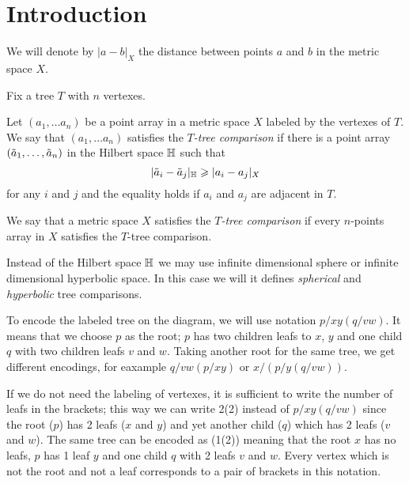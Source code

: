 \section{Introduction}\label{sec:intro}

We will denote by $|a-b|_X$ the distance between points $a$ and $b$ in the metric space $X$.

Fix a tree $T$ with $n$ vertexes.

Let $(a_1,\dots a_n)$ be a point array in a metric space $X$ labeled by the vertexes of $T$.
We say that $(a_1,\dots a_n)$  satisfies the \emph{$T$-tree comparison} if there is a point array $(\~a_1,\dots, \~a_n)$ in the Hilbert space $\HH$ such that 
\[|\~a_i-\~a_j|_\HH\ge|a_i-a_j|_X\]
for any $i$ and $j$ and the equality holds if $a_i$ and $a_j$ are adjacent in $T$.

We say that a metric space $X$ satisfies the \emph{$T$-tree comparison} if 
every $n$-points array in $X$ satisfies the $T$-tree comparison.

Instead of the Hilbert space $\HH$ we may use infinite dimensional sphere or infinite dimensional hyperbolic space.
In this case we will it defines \emph{spherical} and \emph{hyperbolic} tree comparisons.

\begin{wrapfigure}{r}{27 mm}
\vskip-8mm
\end{wrapfigure}

To encode the labeled tree on the diagram, we will use notation $p/xy(q/vw)$.
It means that we choose $p$ as the root; 
$p$ has two children leafs to $x$, $y$ and one child $q$ with two children leafs $v$ and $w$.
Taking another root for the same tree, we get different encodings, for eaxample $q/vw(p/xy)$ or $x/(p/y(q/vw))$.

If we do not need the labeling of vertexes,
it is sufficient to write the number of leafs in the brackets;
this way we can write 2(2) instead of $p/xy(q/vw)$ since the root ($p$) has 2 leafs ($x$ and $y$) and yet another child ($q$) which has 2 leafs ($v$ and $w$).  
The same tree can be encoded as (1(2)) meaning that the root $x$ has no leafs, 
$p$ has 1 leaf $y$ and one child $q$ with 2 leafs $v$ and $w$.
Every vertex which is not the root and not a leaf corresponds to a pair of brackets in this notation.

